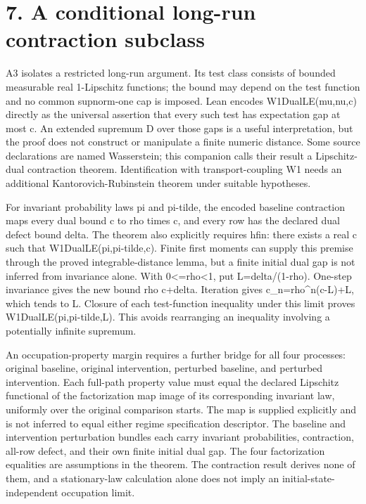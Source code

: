 \documentclass[11pt,a4paper]{article}
\begin{document}
\section{7. A conditional long-run contraction subclass}
A3 isolates a restricted long-run argument. Its test class consists of bounded measurable real 1-Lipschitz functions; the bound may depend on the test function and no common supnorm-one cap is imposed. Lean encodes W1DualLE(mu,nu,c) directly as the universal assertion that every such test has expectation gap at most c. An extended supremum D over those gaps is a useful interpretation, but the proof does not construct or manipulate a finite numeric distance. Some source declarations are named Wasserstein; this companion calls their result a Lipschitz-dual contraction theorem. Identification with transport-coupling W1 needs an additional Kantorovich-Rubinstein theorem under suitable hypotheses.

For invariant probability laws pi and pi-tilde, the encoded baseline contraction maps every dual bound c to rho times c, and every row has the declared dual defect bound delta. The theorem also explicitly requires hfin: there exists a real c such that W1DualLE(pi,pi-tilde,c). Finite first moments can supply this premise through the proved integrable-distance lemma, but a finite initial dual gap is not inferred from invariance alone. With 0<=rho<1, put L=delta/(1-rho). One-step invariance gives the new bound rho c+delta. Iteration gives c\_n=rho\textasciicircum{}n(c-L)+L, which tends to L. Closure of each test-function inequality under this limit proves W1DualLE(pi,pi-tilde,L). This avoids rearranging an inequality involving a potentially infinite supremum.

An occupation-property margin requires a further bridge for all four processes: original baseline, original intervention, perturbed baseline, and perturbed intervention. Each full-path property value must equal the declared Lipschitz functional of the factorization map image of its corresponding invariant law, uniformly over the original comparison starts. The map is supplied explicitly and is not inferred to equal either regime specification descriptor. The baseline and intervention perturbation bundles each carry invariant probabilities, contraction, all-row defect, and their own finite initial dual gap. The four factorization equalities are assumptions in the theorem. The contraction result derives none of them, and a stationary-law calculation alone does not imply an initial-stat\allowbreak{}e-independen\allowbreak{}t occupation limit.
\end{document}
